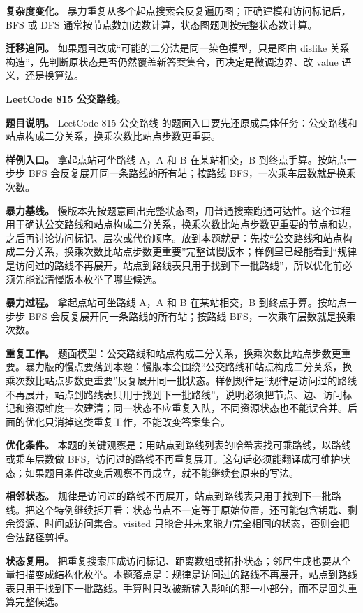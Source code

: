 \textbf{复杂度变化。} 暴力重复从多个起点搜索会反复遍历图；正确建模和访问标记后，BFS 或 DFS 通常按节点数加边数计算，状态图题则按完整状态数计算。

\textbf{迁移追问。} 如果题目改成“可能的二分法是同一染色模型，只是图由 dislike 关系构造”，先判断原状态是否仍然覆盖新答案集合，再决定是微调边界、改 value 语义，还是换算法。

\noindent\textbf{LeetCode 815 公交路线。}

\textbf{题目说明。} LeetCode 815 公交路线 的题面入口要先还原成具体任务：公交路线和站点构成二分关系，换乘次数比站点步数更重要。

\textbf{样例入口。} 拿起点站可坐路线 A，A 和 B 在某站相交，B 到终点手算。按站点一步步 BFS 会反复展开同一条路线的所有站；按路线 BFS，一次乘车层数就是换乘次数。

\textbf{暴力基线。} 慢版本先按题意画出完整状态图，用普通搜索跑通可达性。这个过程用于确认公交路线和站点构成二分关系，换乘次数比站点步数更重要的节点和边，之后再讨论访问标记、层次或代价顺序。放到本题就是：先按“公交路线和站点构成二分关系，换乘次数比站点步数更重要”完整试慢版本；样例里已经能看到“规律是访问过的路线不再展开，站点到路线表只用于找到下一批路线”，所以优化前必须先能说清慢版本枚举了哪些候选。

\textbf{暴力过程。} 拿起点站可坐路线 A，A 和 B 在某站相交，B 到终点手算。按站点一步步 BFS 会反复展开同一条路线的所有站；按路线 BFS，一次乘车层数就是换乘次数。

\textbf{重复工作。} 题面模型：公交路线和站点构成二分关系，换乘次数比站点步数更重要。暴力版的慢点要落到本题：慢版本会围绕“公交路线和站点构成二分关系，换乘次数比站点步数更重要”反复展开同一批状态。样例规律是“规律是访问过的路线不再展开，站点到路线表只用于找到下一批路线”，说明必须把节点、边、访问标记和资源维度一次建清；同一状态不应重复入队，不同资源状态也不能误合并。后面的优化只消掉这类重复工作，不能改变答案集合。

\textbf{优化条件。} 本题的关键观察是：用站点到路线列表的哈希表找可乘路线，以路线或乘车层数做 BFS，访问过的路线不再重复展开。这句话必须能翻译成可维护状态；如果题目条件改变后观察不再成立，就不能继续套原来的写法。

\textbf{相邻状态。} 规律是访问过的路线不再展开，站点到路线表只用于找到下一批路线。把这个特例继续拆开看：状态节点不一定等于原始位置，还可能包含钥匙、剩余资源、时间或访问集合。visited 只能合并未来能力完全相同的状态，否则会把合法路径剪掉。

\textbf{状态复用。} 把重复搜索压成访问标记、距离数组或拓扑状态；邻居生成也要从全量扫描变成结构化枚举。本题落点是：规律是访问过的路线不再展开，站点到路线表只用于找到下一批路线。手算时只改被新输入影响的那一小部分，而不是回头重算完整候选。


